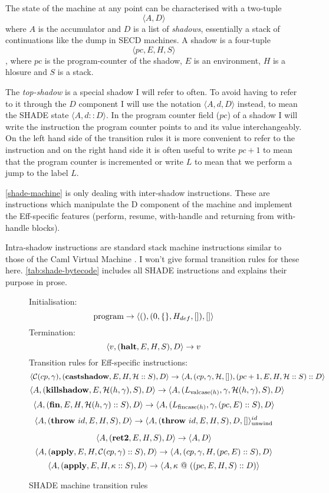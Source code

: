 \documentclass[class=article, crop=false]{standalone}
\begin{document}
The state of the machine at any point can be characterised with a two-tuple
$$ \langle A, D \rangle $$
where $A$ is the accumulator and $D$ is a list of \emph{shadows}, essentially a stack
of continuations like the dump in SECD machines.
A shadow is a four-tuple $$ \langle pc, E, H, S \rangle $$, where $pc$ is the
program-counter of the shadow, $E$ is an environment, $H$ is a hlosure and $S$ is
a stack.

The \emph{top-shadow} is a special shadow I will refer to often. To avoid having to refer to
it through the $D$ component I will use the notation $\langle A, d, D \rangle$ instead, to mean the SHADE state
 $\langle A, d :: D \rangle$.
In the program counter field ($pc$) of a shadow I will write the instruction the program counter
points to and its value interchangeably. On the left hand side of the transition rules it is more
convenient to refer to the instruction and on the right hand side it is often useful to write
$pc+1$ to mean that the program counter is incremented or write $L$ to mean
that we perform a jump to the label $L$.

\autoref{shade-machine} is only dealing with inter-shadow instructions. These are instructions which manipulate
the D component of the machine and implement the Eff-specific features (perform, resume, with-handle and
returning from with-handle blocks).

Intra-shadow instructions are standard stack machine instructions similar to those of the Caml Virtual Machine \cite{caml-vm}.
I won't give formal transition rules for these here. \autoref{tab:shade-bytecode} includes all SHADE instructions and explains their purpose in prose.

\begin{figure}
    Initialisation:
    $$\text{program} \to \langle \mathbf{()}, (0, \{\}, H_{def}, []), [] \rangle$$
    Termination:
    $$ \langle v, (\mathbf{halt}, E, H, S), D \rangle \to v $$
    Transition rules for Eff-specific instructions:
    $$ \langle \mathcal{C}(cp, \gamma), (\mathbf{castshadow}, E, H, \mathcal{H} :: S), D \rangle \to \langle A, (cp, \gamma, \mathcal{H}, []), (pc+1, E, H, \mathcal{H} :: S) :: D \rangle $$
    $$ \langle A, (\mathbf{killshadow}, E, \mathcal{H}(h, \gamma), S), D \rangle \to  \langle A, (L_{\text{valcase}(h)}, \gamma, \mathcal{H}(h, \gamma),S), D \rangle $$
    $$ \langle A, (\mathbf{fin}, E, H, \mathcal{H}(h, \gamma) :: S), D \rangle \to \langle A, (L_{\text{fincase}(h)}, \gamma, (pc, E) :: S), D \rangle $$
    $$ \langle A, (\mathbf{throw}\ id, E, H, S), D \rangle \to \langle A, (\mathbf{throw}\ id, E, H, S), D, [] \rangle_\text{unwind}^{id} $$

    $$ \langle A, (\mathbf{ret2}, E, H, S), D \rangle \to \langle A, D \rangle $$
    $$ \langle A, (\mathbf{apply}, E, H, \mathcal{C}(cp, \gamma) :: S), D \rangle \to \langle A, (cp, \gamma, H, (pc, E) :: S), D \rangle $$
    $$ \langle A, (\mathbf{apply}, E, H, \kappa :: S), D \rangle \to \langle A, \kappa\ @\ ((pc, E, H, S) :: D) \rangle $$

    \caption{SHADE machine transition rules}
    \label{fig:shade-machine}
\end{figure}
\end{document}
